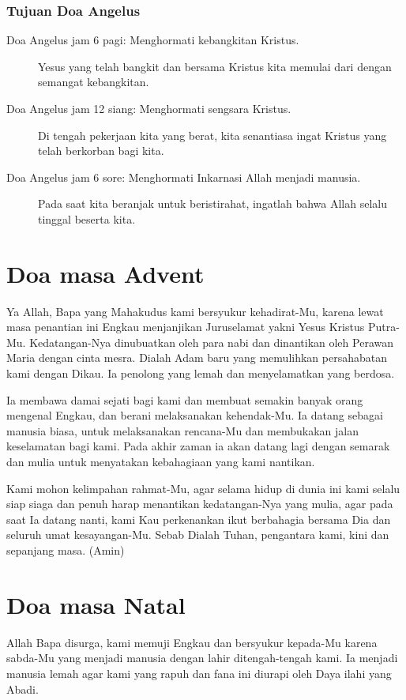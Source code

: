 \subsubsection[Tujuan Doa Angelus]{Tujuan Doa Angelus}
\begin{description} 
\item[Doa Angelus jam 6 pagi: Menghormati kebangkitan Kristus.]

Yesus yang telah bangkit dan bersama Kristus kita memulai dari dengan
semangat kebangkitan.

\item [Doa Angelus jam 12 siang: Menghormati sengsara Kristus.]

Di tengah pekerjaan kita yang berat, kita senantiasa ingat Kristus yang
telah berkorban bagi kita.

\item [Doa Angelus jam 6 sore: Menghormati Inkarnasi Allah menjadi manusia.]

Pada saat kita beranjak untuk beristirahat, ingatlah bahwa Allah selalu
tinggal beserta kita.
\end{description}

\small
\section[Doa masa Advent]{Doa masa Advent}
Ya Allah, Bapa yang Mahakudus kami bersyukur kehadirat-Mu, karena lewat
masa penantian ini Engkau menjanjikan Juruselamat yakni Yesus Kristus
Putra-Mu. Kedatangan-Nya dinubuatkan oleh para nabi dan dinantikan oleh
Perawan Maria dengan cinta mesra. Dialah Adam baru yang memulihkan
persahabatan kami dengan Dikau. Ia penolong yang lemah dan
menyelamatkan yang berdosa.

Ia membawa damai sejati bagi kami dan membuat semakin banyak orang
mengenal Engkau, dan berani melaksanakan kehendak-Mu. Ia datang sebagai
manusia biasa, untuk melaksanakan rencana-Mu dan membukakan jalan
keselamatan bagi kami. Pada akhir zaman ia akan datang lagi dengan
semarak dan mulia untuk menyatakan kebahagiaan yang kami nantikan.

Kami mohon kelimpahan rahmat-Mu, agar selama hidup di dunia ini kami
selalu siap siaga dan penuh harap menantikan kedatangan-Nya yang mulia,
agar pada saat Ia datang nanti, kami Kau perkenankan ikut berbahagia
bersama Dia dan seluruh umat kesayangan-Mu. Sebab Dialah Tuhan,
pengantara kami, kini dan sepanjang masa. (Amin)

\section[Doa masa Natal]{Doa masa Natal}
Allah Bapa disurga, kami memuji Engkau dan bersyukur kepada-Mu karena
sabda-Mu yang menjadi manusia dengan lahir ditengah-tengah kami. Ia
menjadi manusia lemah agar kami yang rapuh dan fana ini diurapi oleh
Daya ilahi yang Abadi.

